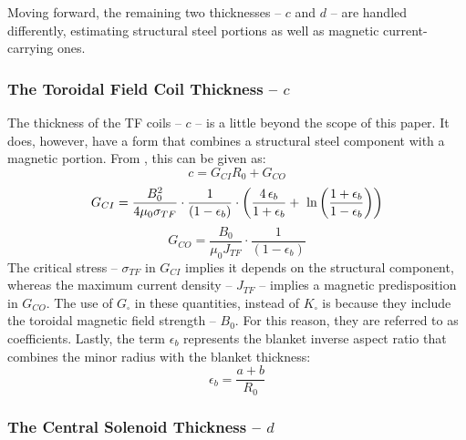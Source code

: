 Moving forward, the remaining two thicknesses -- $c$ and $d$ -- are handled differently, estimating structural steel portions as well as magnetic current-carrying ones.

\subsubsection{The Toroidal Field Coil Thickness -- $c$}

The thickness of the TF coils -- $c$ -- is a little beyond the scope of this paper. It does, however, have a form that combines a structural steel component with a magnetic portion. From , this can be given as: \cite{minervini}
\begin{equation}
	\label{eq:cc}
	c = G_{CI} R_0 + G_{CO}
\end{equation}
\begin{equation}
	G_{CI} = \frac{B_{0}^2}{ 4 \mu_0 \sigma_{TF} } \cdot \frac{1}{ ( 1 - \epsilon_b )}  \cdot \left( \frac{ 4 \, \epsilon_b}{1+\epsilon_b} + \ \textnormal{ln} \left( \frac{1+\epsilon_b}{1-\epsilon_b} \right) \right) 
\end{equation}
\begin{equation}
	G_{CO} = \frac{B_{0}}{ \mu_0 J_{TF} } \cdot \frac{1}{ ( 1 - \epsilon_b )}
\end{equation}
The critical stress -- $\sigma_{TF}$ in $G_{CI}$ implies it depends on the structural component, whereas the maximum current density -- $J_{TF}$ -- implies a magnetic predisposition in $G_{CO}$. The use of $G_\square$ in these quantities, instead of $K_\square$ is because they include the toroidal magnetic field strength -- $B_0$. For this reason, they are referred to as  coefficients. Lastly, the term $\epsilon_b$ represents the blanket inverse aspect ratio that combines the minor radius with the blanket thickness:
\begin{equation}
	\epsilon_b = \frac{ a + b }{R_0}
\end{equation}

\subsubsection{The Central Solenoid Thickness -- $d$}


